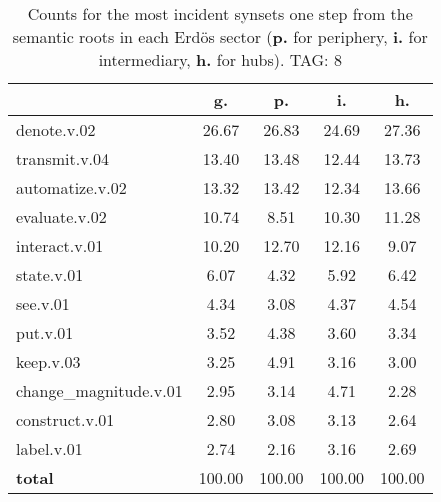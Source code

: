 \begin{table}[h!]
\begin{center}
\begin{tabular}{| l || c | c | c | c |}\hline
 & {\bf g.} & {\bf p.} & {\bf i.} & {\bf h.} \\\hline\hline
denote.v.02 & 26.67  & 26.83  & 24.69  & 27.36 \\\hline
transmit.v.04 & 13.40  & 13.48  & 12.44  & 13.73 \\\hline
automatize.v.02 & 13.32  & 13.42  & 12.34  & 13.66 \\\hline
evaluate.v.02 & 10.74  & 8.51  & 10.30  & 11.28 \\\hline
interact.v.01 & 10.20  & 12.70  & 12.16  & 9.07 \\\hline
state.v.01 & 6.07  & 4.32  & 5.92  & 6.42 \\\hline
see.v.01 & 4.34  & 3.08  & 4.37  & 4.54 \\\hline
put.v.01 & 3.52  & 4.38  & 3.60  & 3.34 \\\hline
keep.v.03 & 3.25  & 4.91  & 3.16  & 3.00 \\\hline
change\_magnitude.v.01 & 2.95  & 3.14  & 4.71  & 2.28 \\\hline
construct.v.01 & 2.80  & 3.08  & 3.13  & 2.64 \\\hline
label.v.01 & 2.74  & 2.16  & 3.16  & 2.69 \\\hline\hline
{{\bf total}} & 100.00  & 100.00  & 100.00  & 100.00 \\\hline
\end{tabular}
\caption{Counts for the most incident synsets one step from the semantic roots in each Erd\"os sector ({\bf p.} for periphery, {\bf i.} for intermediary, {\bf h.} for hubs). TAG: 8}
\end{center}
\end{table}